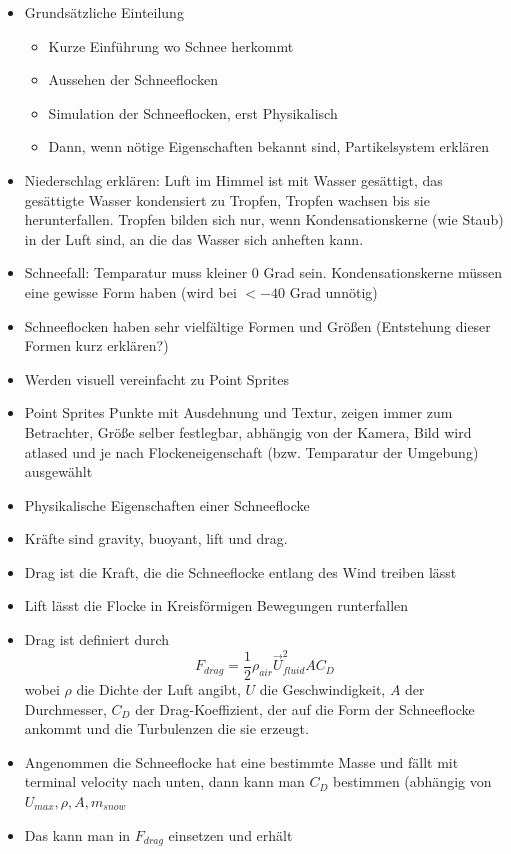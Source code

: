 \begin{itemize}
\item Grundsätzliche Einteilung
    \begin{itemize}
    \item Kurze Einführung wo Schnee herkommt
    \item Aussehen der Schneeflocken
    \item Simulation der Schneeflocken, erst Physikalisch
    \item Dann, wenn nötige Eigenschaften bekannt sind, Partikelsystem erklären
    \end{itemize}
\item Niederschlag erklären: Luft im Himmel ist mit Wasser gesättigt, das
gesättigte Wasser kondensiert zu Tropfen, Tropfen wachsen bis sie
herunterfallen. Tropfen bilden sich nur, wenn Kondensationskerne (wie Staub) in
der Luft sind, an die das Wasser sich anheften kann.
\item Schneefall: Temparatur muss kleiner 0 Grad sein. Kondensationskerne müssen
eine gewisse Form haben (wird bei $<-40$ Grad unnötig)
\item Schneeflocken haben sehr vielfältige Formen und Größen (Entstehung dieser Formen kurz erklären?)
\item Werden visuell vereinfacht zu Point Sprites
\item Point Sprites Punkte mit Ausdehnung und Textur, zeigen immer zum
Betrachter, Größe selber festlegbar, abhängig von der Kamera, Bild wird atlased
und je nach Flockeneigenschaft (bzw. Temparatur der Umgebung) ausgewählt
\item Physikalische Eigenschaften einer Schneeflocke
\item Kräfte sind gravity, buoyant, lift und drag.
\item Drag ist die Kraft, die die Schneeflocke entlang des Wind treiben lässt
\item Lift lässt die Flocke in Kreisförmigen Bewegungen runterfallen
\item Drag ist definiert durch
\[
F_{drag} = \frac{1}{2} \rho_{air} \vec{U}_{fluid}^2 A C_D
\]
wobei $\rho$ die Dichte der Luft angibt, $U$ die
Geschwindigkeit, $A$ der Durchmesser, $C_D$ der Drag-Koeffizient, der auf die
Form der Schneeflocke ankommt und die Turbulenzen die sie erzeugt.
\item Angenommen die Schneeflocke hat eine bestimmte Masse und fällt mit
terminal velocity nach unten, dann kann man $C_D$ bestimmen (abhängig von $U_{max}, \rho, A, m_{snow}$
\item Das kann man in $F_{drag}$ einsetzen und erhält

\end{itemize}
